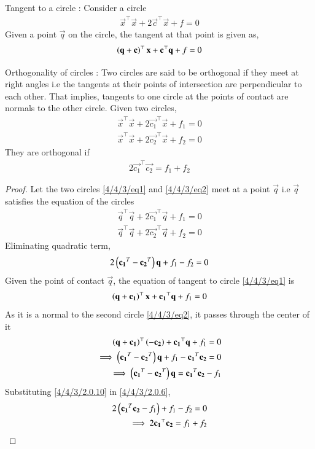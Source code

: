 \begin{lemma}
Tangent to a circle : Consider a circle 
\begin{align}
    \vec{x}^\top\vec{x} + 2\vec{c}^\top\vec{x} + f = 0 
\end{align}
Given a point $\vec{q}$ on the circle, the tangent at that point is given as,
\begin{align}
    \left(\mathbf{q}+\mathbf{c}\right)^\top\mathbf{x} + \mathbf{c}^\top\mathbf{q} + f = 0 
\end{align}
\end{lemma}
\begin{lemma}
Orthogonality of circles : Two circles are said to be orthogonal if they meet at right angles i.e the tangents at their points of intersection are perpendicular to each other. That implies, tangents to one circle at the points of contact are normals to the other circle. 
Given two circles,
\begin{align}
    \vec{x}^\top\vec{x} + 2\vec{c_1}^\top\vec{x} + f_1 = 0 \label{4/4/3/eq1}\\
    \vec{x}^\top\vec{x} + 2\vec{c_2}^\top\vec{x} + f_2 = 0 \label{4/4/3/eq2}
\end{align}
They are orthogonal if
\begin{align}
    2\vec{c_1}^\top\vec{c_2} = f_1 + f_2 \label{4/4/3/condition}
\end{align}
\end{lemma}
\begin{proof}
Let the two circles \eqref{4/4/3/eq1} and \eqref{4/4/3/eq2} meet at a point $\vec{q}$ i.e $\vec{q}$ satisfies the equation of the circles
\begin{align}
    \vec{q}^\top\vec{q} + 2\vec{c_1}^\top\vec{q} + f_1 = 0 \label{4/4/3/2.0.4}\\
    \vec{q}^\top\vec{q} + 2\vec{c_2}^\top\vec{q} + f_2 = 0 \label{4/4/3/2.0.5}
\end{align}
Eliminating quadratic term,
\begin{align}
    2\left(\mathbf{c_1}^T - \mathbf{c_2}^T\right)\mathbf{q} + f_1 - f_2 = 0 \label{4/4/3/2.0.6}
\end{align}
Given the point of contact $\vec{q}$, the equation of tangent to circle \eqref{4/4/3/eq1} is
\begin{align}
    \left(\mathbf{q}+\mathbf{c_1}\right)^\top\mathbf{x} + \mathbf{c_1}^\top\mathbf{q} + f_1 = 0 
\end{align}
As it is a normal to the second circle \eqref{4/4/3/eq2}, it passes through the center of it
\begin{align}
    \left(\mathbf{q}+\mathbf{c_1}\right)^\top\left(\mathbf{-c_2}\right) + \mathbf{c_1}^\top\mathbf{q} + f_1 = 0 \\
    \implies \left(\mathbf{c_1}^T - \mathbf{c_2}^T\right)\mathbf{q} + f_1 - \mathbf{c_1}^T\mathbf{c_2} = 0 \\
    \implies \left(\mathbf{c_1}^T - \mathbf{c_2}^T\right)\mathbf{q} = \mathbf{c_1}^T\mathbf{c_2} - f_1
    \label{4/4/3/2.0.10}
\end{align}
Substituting \eqref{4/4/3/2.0.10} in \eqref{4/4/3/2.0.6},
\begin{align}
    2\left(\mathbf{c_1}^T\mathbf{c_2} - f_1\right)  + f_1 - f_2 = 0 \\
    \implies 2\mathbf{c_1}^\top\mathbf{c_2} = f_1 + f_2 
\end{align}
\end{proof}
